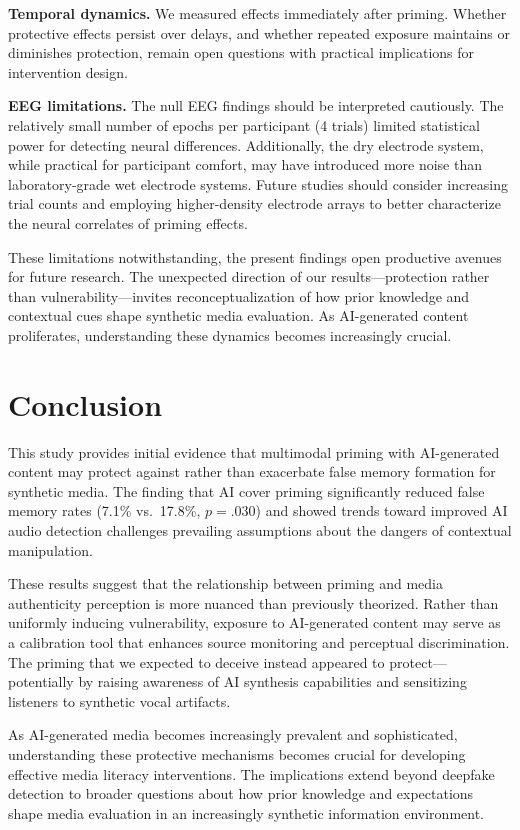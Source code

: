 \documentclass[12pt, a4paper]{article}
\begin{document}
\textbf{Temporal dynamics.} We measured effects immediately after priming. Whether protective effects persist over delays, and whether repeated exposure maintains or diminishes protection, remain open questions with practical implications for intervention design.

\textbf{EEG limitations.} The null EEG findings should be interpreted cautiously. The relatively small number of epochs per participant (4 trials) limited statistical power for detecting neural differences. Additionally, the dry electrode system, while practical for participant comfort, may have introduced more noise than laboratory-grade wet electrode systems. Future studies should consider increasing trial counts and employing higher-density electrode arrays to better characterize the neural correlates of priming effects.

These limitations notwithstanding, the present findings open productive avenues for future research. The unexpected direction of our results---protection rather than vulnerability---invites reconceptualization of how prior knowledge and contextual cues shape synthetic media evaluation. As AI-generated content proliferates, understanding these dynamics becomes increasingly crucial.

\section{Conclusion}

This study provides initial evidence that multimodal priming with AI-generated content may protect against rather than exacerbate false memory formation for synthetic media. The finding that AI cover priming significantly reduced false memory rates (7.1\% vs.\ 17.8\%, $p = .030$) and showed trends toward improved AI audio detection challenges prevailing assumptions about the dangers of contextual manipulation.

These results suggest that the relationship between priming and media authenticity perception is more nuanced than previously theorized. Rather than uniformly inducing vulnerability, exposure to AI-generated content may serve as a calibration tool that enhances source monitoring and perceptual discrimination. The priming that we expected to deceive instead appeared to protect---potentially by raising awareness of AI synthesis capabilities and sensitizing listeners to synthetic vocal artifacts.

As AI-generated media becomes increasingly prevalent and sophisticated, understanding these protective mechanisms becomes crucial for developing effective media literacy interventions. The implications extend beyond deepfake detection to broader questions about how prior knowledge and expectations shape media evaluation in an increasingly synthetic information environment.
\end{document}
